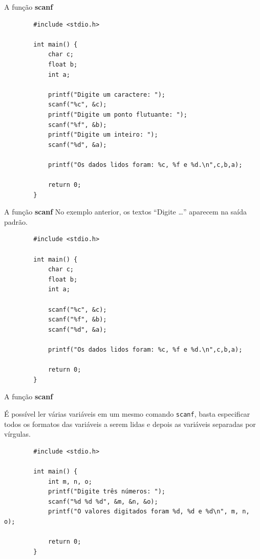 \documentclass[handout]{beamer}
\newcommand{\cod}[1]{\texttt{#1}}
\begin{document}
\begin{frame}[fragile]{A função {\bf scanf}}
    \begin{verbatim}
        #include <stdio.h>

        int main() {
            char c;
            float b;
            int a;

            printf("Digite um caractere: ");
            scanf("%c", &c);
            printf("Digite um ponto flutuante: ");
            scanf("%f", &b);
            printf("Digite um inteiro: ");
            scanf("%d", &a);

            printf("Os dados lidos foram: %c, %f e %d.\n",c,b,a);

            return 0;
        }
    \end{verbatim}
\end{frame}

\begin{frame}[fragile]{A função {\bf scanf}}
    No exemplo anterior, os textos ``Digite \ldots'' aparecem na saída padrão.

    \begin{verbatim}
        #include <stdio.h>

        int main() {
            char c;
            float b;
            int a;

            scanf("%c", &c);
            scanf("%f", &b);
            scanf("%d", &a);

            printf("Os dados lidos foram: %c, %f e %d.\n",c,b,a);

            return 0;
        }
    \end{verbatim}
\end{frame}

\begin{frame}[fragile]{A função {\bf scanf}}

    É possível ler várias variáveis em um mesmo comando \cod{scanf}, basta especificar todos os formatos das variáveis a serem lidas e depois as variáveis separadas por vírgulas.

    \begin{verbatim}
        #include <stdio.h>

        int main() {
            int m, n, o;
            printf("Digite três números: ");
            scanf("%d %d %d", &m, &n, &o);
            printf("O valores digitados foram %d, %d e %d\n", m, n, o);

            return 0;
        }
    \end{verbatim}
\end{frame}
\end{document}
